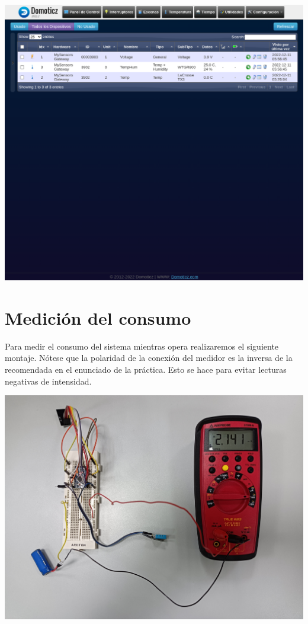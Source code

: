 \includegraphics[width=\linewidth]{nodo2/nodo2-domoticz.png}

\section{Medición del consumo}

Para medir el consumo del sistema mientras opera realizaremos el siguiente
montaje. Nótese que la polaridad de la conexión del medidor es la inversa de la
recomendada en el enunciado de la práctica. Esto se hace para evitar lecturas
negativas de intensidad.

\includegraphics[width=\linewidth]{nodo2/nodo2-consumption.jpg}

